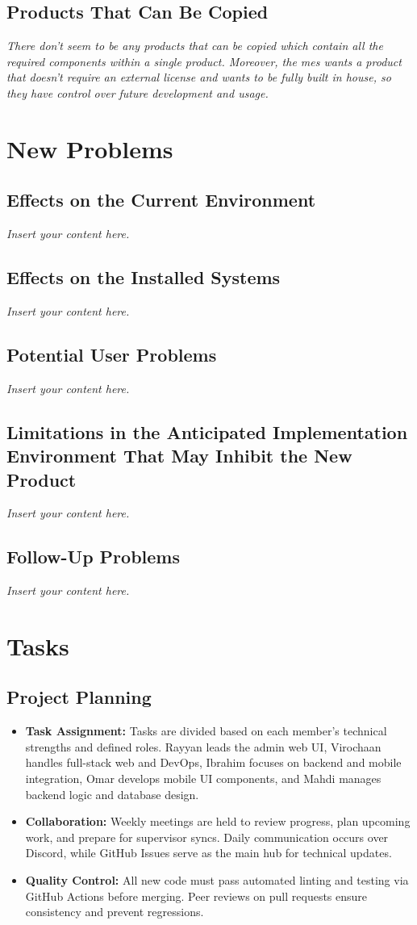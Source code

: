 \documentclass[12pt]{article}
\newcommand{\lips}{\textit{Insert your content here.}}
\begin{document}
\subsection{Products That Can Be Copied}
\textit{There don't seem to be any products that can be copied which contain all the required components within a single
product. Moreover, the \gls{mes} wants a product that doesn't require an external license and wants to be fully built in
house, so they have control over future development and usage.}

\section{New Problems}
\subsection{Effects on the Current Environment}
\lips
\subsection{Effects on the Installed Systems}
\lips
\subsection{Potential User Problems}
\lips
\subsection{Limitations in the Anticipated Implementation Environment That May
Inhibit the New Product}
\lips
\subsection{Follow-Up Problems}
\lips

\section{Tasks}
\subsection{Project Planning }

\begin{itemize}
    \item \textbf{Task Assignment:} Tasks are divided based on each member’s technical strengths and defined roles.
    Rayyan leads the admin web UI, Virochaan handles full-stack web and DevOps, Ibrahim focuses on backend and mobile integration, Omar develops mobile UI components, and Mahdi manages backend logic and database design.
    \item \textbf{Collaboration:} Weekly meetings are held to review progress, plan upcoming work, and prepare for supervisor syncs.
    Daily communication occurs over Discord, while GitHub Issues serve as the main hub for technical updates.
    \item \textbf{Quality Control:} All new code must pass automated linting and testing via GitHub Actions before merging.
    Peer reviews on pull requests ensure consistency and prevent regressions.
\end{itemize}
\end{document}

